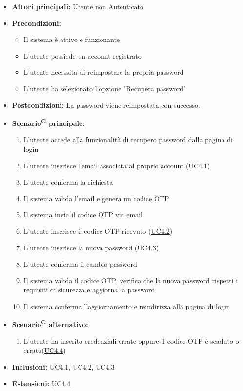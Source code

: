 \documentclass[a4paper, 11pt]{article}
\begin{document}
\begin{itemize}
	\item \textbf{Attori principali:} Utente non Autenticato
	\item \textbf{Precondizioni:} 
	\begin{itemize}
		\item Il sistema è attivo e funzionante
		\item L'utente possiede un account registrato
		\item L'utente necessita di reimpostare la propria password
        \item L'utente ha selezionato l'opzione "Recupera password"
	\end{itemize}
	\item \textbf{Postcondizioni:} La password viene reimpostata con successo.
	\item \textbf{Scenario\textsuperscript{G} principale:}
	\begin{enumerate}
		\item L'utente accede alla funzionalità di recupero password dalla pagina di login
		\item L'utente inserisce l'email associata al proprio account (\hyperref[UC4.1]{UC4.1})
		\item L'utente conferma la richiesta
		\item Il sistema valida l'email e genera un codice OTP
		\item Il sistema invia il codice OTP via email
		\item L'utente inserisce il codice OTP ricevuto (\hyperref[UC4.2]{UC4.2})
		\item L'utente inserisce la nuova password (\hyperref[UC4.3]{UC4.3})
		\item L'utente conferma il cambio password
		\item Il sistema valida il codice OTP, verifica che la nuova password rispetti i requisiti di sicurezza e aggiorna la password
		\item Il sistema conferma l'aggiornamento e reindirizza alla pagina di login
	\end{enumerate}
	\item \textbf{Scenario\textsuperscript{G} alternativo:}
	\begin{enumerate}
		\item L'utente ha inserito credenziali errate oppure il codice OTP è scaduto o errato(\hyperref[UC4.4]{UC4.4})
	\end{enumerate}
	\item \textbf{Inclusioni:} \hyperref[UC4.1]{UC4.1}, \hyperref[UC4.2]{UC4.2}, \hyperref[UC4.3]{UC4.3}
	\item \textbf{Estensioni:} \hyperref[UC4.4]{UC4.4}
\end{itemize}
\end{document}
